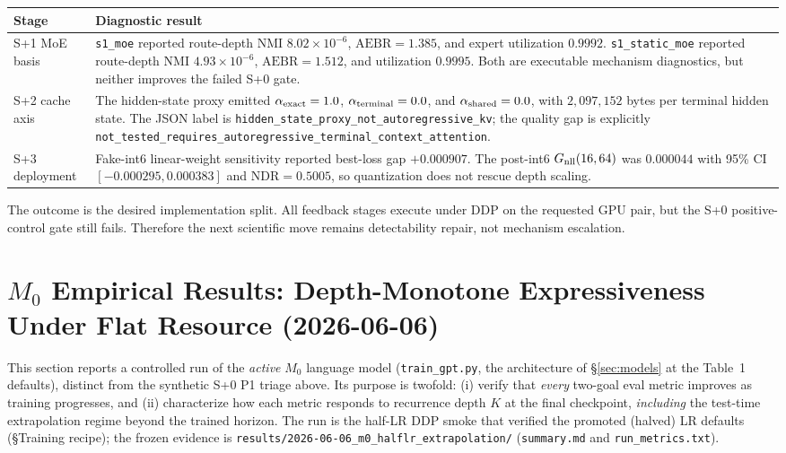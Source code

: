 \documentclass[11pt]{article}
\newcommand{\code}[1]{\texttt{#1}}
\begin{document}
\begin{center}
\scriptsize
\setlength{\tabcolsep}{4pt}
\renewcommand{\arraystretch}{1.12}
\begin{tabularx}{\textwidth}{@{}L{0.20\textwidth} L{0.70\textwidth}@{}}
\toprule
\textbf{Stage} & \textbf{Diagnostic result} \\
\midrule
S+1 MoE basis & \code{s1\_moe} reported route-depth NMI \(8.02{\times}10^{-6}\), \(\mathrm{AEBR}=1.385\), and expert utilization \(0.9992\).  \code{s1\_static\_moe} reported route-depth NMI \(4.93{\times}10^{-6}\), \(\mathrm{AEBR}=1.512\), and utilization \(0.9995\).  Both are executable mechanism diagnostics, but neither improves the failed S+0 gate. \\
S+2 cache axis & The hidden-state proxy emitted \(\alpha_{\rm exact}=1.0\), \(\alpha_{\rm terminal}=0.0\), and \(\alpha_{\rm shared}=0.0\), with \(2{,}097{,}152\) bytes per terminal hidden state.  The JSON label is \code{hidden\_state\_proxy\_not\_autoregressive\_kv}; the quality gap is explicitly \code{not\_tested\_requires\_autoregressive\_terminal\_context\_attention}. \\
S+3 deployment & Fake-int6 linear-weight sensitivity reported best-loss gap \(+0.000907\).  The post-int6 \(G_{\rm nll}(16,64)\) was \(0.000044\) with 95\% CI \([-0.000295,0.000383]\) and \(\mathrm{NDR}=0.5005\), so quantization does not rescue depth scaling. \\
\bottomrule
\end{tabularx}
\end{center}

The outcome is the desired implementation split.  All feedback stages execute under DDP on the
requested GPU pair, but the S+0 positive-control gate still fails.  Therefore the next scientific
move remains detectability repair, not mechanism escalation.

\section{\texorpdfstring{$M_0$}{M0} Empirical Results: Depth-Monotone Expressiveness Under Flat Resource (2026-06-06)}
\label{sec:m0-results}

This section reports a controlled run of the \emph{active} \(M_0\) language model (\code{train\_gpt.py},
the architecture of \S\ref{sec:models} at the Table~1 defaults), distinct from the synthetic S+0 P1
triage above.  Its purpose is twofold: (i) verify that \emph{every} two-goal eval metric improves as
training progresses, and (ii) characterize how each metric responds to recurrence depth \(K\) at the
final checkpoint, \emph{including} the test-time extrapolation regime beyond the trained horizon.
The run is the half-LR DDP smoke that verified the promoted (halved) LR defaults (\S Training recipe);
the frozen evidence is \code{results/2026-06-06\_m0\_halflr\_extrapolation/} (\code{summary.md} and
\code{run\_metrics.txt}).
\end{document}
